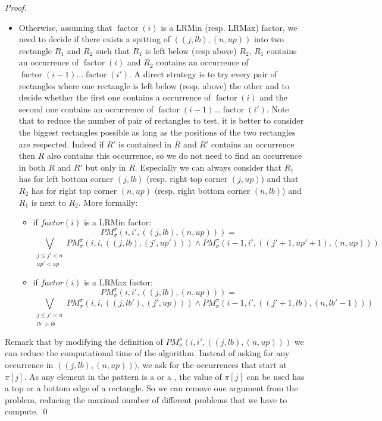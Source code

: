 \documentclass[a4paper]{llncs}
\newcommand{\RLMin}{\text{RLMin}\xspace}
\newcommand{\RLMax}{\text{RLMax}\xspace}
\newcounter{num}
\newcommand{\PM}{PM}
\DeclareMathOperator{\factor}{factor}
\begin{document}
\begin{proof}
\begin{itemize}
\item Otherwise, assuming that $\factor(i)$ is a LRMin (resp. LRMax) factor,
we need to decide if there exists a spitting of $((j,lb),(n,up))$  into two rectangle $R_1$ and $R_2$ such that
$R_1$ is left below (resp above) $R_2$,
 $R_1$ contains an occurrence of $\factor(i)$
and  $R_2$ contains an occurrence of
$\factor(i-1)\ldots \factor(i')$.
A direct strategy is to try every pair of rectangles where one rectangle is left below (resp. above) the other
and to decide whether the first one contains a occurrence of $\factor(i)$
and the second one contains an occurrence of
$\factor(i-1)\ldots \factor(i')$.
Note that to reduce the number of pair of rectangles to test,
it is better to consider the biggest rectangles possible
as long as the positions of the two rectangles are respected.
Indeed if $R'$ is contained in $R$ and $R'$ contains an occurrence then
$R$ also contains this occurrence,
so we do not
need to find an occurrence in both $R$ and $R'$
but only in $R$.
Especially we can always consider that $R_1$ has for
left bottom corner $(j,lb)$ (resp. right top corner  $(j,up)$)
and that $R_2$ has for right top corner $(n,up)$
(resp. right bottom corner $(n,lb)$)
and $R_1$ is next to $R_2$.
More formally:
\begin{itemize}
\item if $factor(i)$ is a LRMin factor:
$$
\PM^\pi_\sigma(i,i',((j,lb),(n,up))) =
$$
$$
\bigvee_{
\substack{
j\leq j'<n\\ up' < up
}	} \PM^\pi_\sigma(i,i,((j,lb),(j',up'))) \wedge
\PM^\pi_\sigma(i-1,i',((j'+1,up'+1),(n,up)))
$$



\item if $factor(i)$ is a LRMax factor:
$$
\PM^\pi_\sigma(i,i',((j,lb),(n,up))) =
$$
$$
\bigvee_{\substack{
j\leq j'<n \\ lb'>lb
	}	} \PM^\pi_\sigma(i,i,((j,lb'),(j',up))) \wedge
\PM^\pi_\sigma(i-1,i',((j'+1,lb),(n,lb'-1)))
$$
\end{itemize}
\end{itemize}

Remark that by modifying the definition of $\PM^\pi_\sigma(i,i',((j,lb),(n,up)))$
we can reduce the computational time of the algorithm.
Instead of asking for any occurrence in $((j,lb),(n,up)))$,
we ask for the occurrences that start at $\pi[j]$.
As any element in the pattern is a \RLMax or a \RLMin,
the value of $\pi[j]$ can be used has a top or a bottom edge
of a rectangle.
So we can remove one argument from the problem,
reducing the maximal number of different problems that we have to compute.
\qed
\end{proof}
\end{document}
